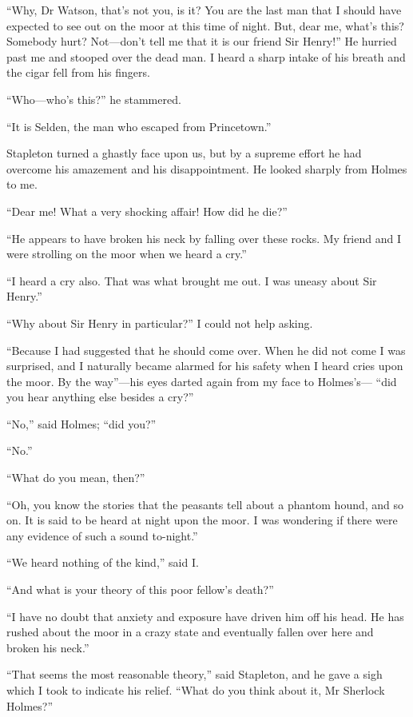 \documentclass[paper=5.5in:8.5in,BCOR=7mm,twoside,DIV=calc,12pt,usegeometry,openany,chapterprefix,endperiod]{scrbook} %
\begin{document}
\enquote{Why, Dr Watson, that's not you, is it? You are the last man that I should have expected to see out on the moor at this time of night. But, dear me, what's this? Somebody hurt? Not\nobreakdash---don't tell me that it is our friend Sir Henry!} He hurried past me and stooped over the dead man. I heard a sharp intake of his breath and the cigar fell from his fingers.

\enquote{Who\nobreakdash---who's this?} he stammered.

\enquote{It is Selden, the man who escaped from Princetown.}

Stapleton turned a ghastly face upon us, but by a supreme effort he had overcome his amazement and his disappointment. He looked sharply from Holmes to me.

\enquote{Dear me! What a very shocking affair! How did he die?}

\enquote{He appears to have broken his neck by falling over these rocks. My friend and I were strolling on the moor when we heard a cry.}

\enquote{I heard a cry also. That was what brought me out. I was uneasy about Sir Henry.}

\enquote{Why about Sir Henry in particular?} I could not help asking.

\enquote{Because I had suggested that he should come over. When he did not come I was surprised, and I naturally became alarmed for his safety when I heard cries upon the moor. By the way}\nobreakdash---his eyes darted again from my face to Holmes's\nobreakdash--- \enquote{did you hear anything else besides a cry?}

\enquote{No,} said Holmes; \enquote{did you?}

\enquote{No.}

\enquote{What do you mean, then?}

\enquote{Oh, you know the stories that the peasants tell about a phantom hound, and so on. It is said to be heard at night upon the moor. I was wondering if there were any evidence of such a sound to-night.}

\enquote{We heard nothing of the kind,} said I.

\enquote{And what is your theory of this poor fellow's death?}

\enquote{I have no doubt that anxiety and exposure have driven him off his head. He has rushed about the moor in a crazy state and eventually fallen over here and broken his neck.}

\enquote{That seems the most reasonable theory,} said Stapleton, and he gave a sigh which I took to indicate his relief. \enquote{What do you think about it, Mr Sherlock Holmes?}
\end{document}
